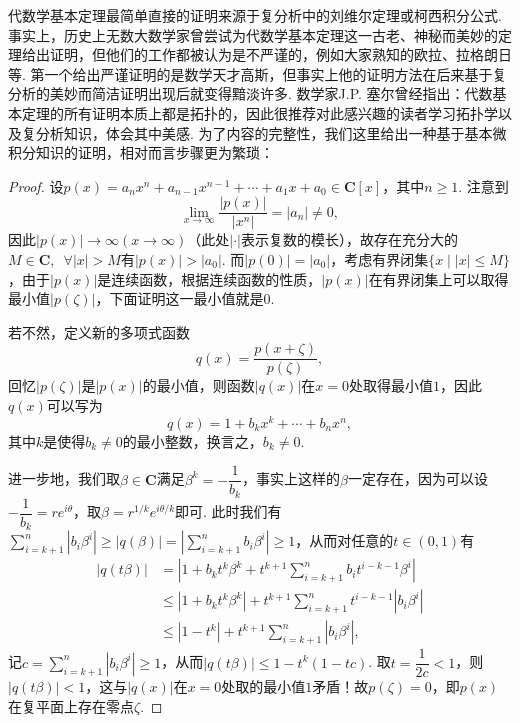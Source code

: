 代数学基本定理最简单直接的证明来源于复分析中的刘维尔定理或柯西积分公式. 事实上，历史上无数大数学家曾尝试为代数学基本定理这一古老、神秘而美妙的定理给出证明，但他们的工作都被认为是不严谨的，例如大家熟知的欧拉、拉格朗日等. 第一个给出严谨证明的是数学天才高斯，但事实上他的证明方法在后来基于复分析的美妙而简洁证明出现后就变得黯淡许多. 数学家J.P. 塞尔曾经指出：代数基本定理的所有证明本质上都是拓扑的，因此很推荐对此感兴趣的读者学习拓扑学以及复分析知识，体会其中美感. 为了内容的完整性，我们这里给出一种基于基本微积分知识的证明，相对而言步骤更为繁琐：
\begin{proof}
    设$p(x)=a_nx^n+a_{n-1}x^{n-1}+\cdots+a_1x+a_0\in\mathbf{C}[x]$，其中$n\geqslant 1$. 注意到
    \[\lim_{x\to\infty}\dfrac{|p(x)|}{|x^n|}=|a_n|\neq 0,\]
    因此$|p(x)|\to\infty(x\to\infty)$（此处$|\cdot|$表示复数的模长），故存在充分大的$M\in\mathbf{C},\enspace\forall |x|>M$有$|p(x)|>|a_0|$. 而$|p(0)|=|a_0|$，考虑有界闭集$\{x\mid |x|\leqslant M\}$，由于$|p(x)|$是连续函数，根据连续函数的性质，$|p(x)|$在有界闭集上可以取得最小值$|p(\zeta)|$，下面证明这一最小值就是$0$.

    若不然，定义新的多项式函数
    \[q(x)=\dfrac{p(x+\zeta)}{p(\zeta)},\]
    回忆$|p(\zeta)|$是$|p(x)|$的最小值，则函数$|q(x)|$在$x=0$处取得最小值$1$，因此$q(x)$可以写为
    \[q(x)=1+b_kx^k+\cdots+b_nx^n,\]
    其中$k$是使得$b_k\neq 0$的最小整数，换言之，$b_k\neq 0$.

    进一步地，我们取$\beta\in\mathbf{C}$满足$\beta^k=-\dfrac{1}{b_k}$，事实上这样的$\beta$一定存在，因为可以设$-\dfrac{1}{b_k}=re^{i\theta}$，取$\beta=r^{1/k}e^{i\theta/k}$即可. 此时我们有$\sum\limits_{i=k+1}^n |b_i\beta^i|\geqslant |q(\beta)|=\left|\sum\limits_{i=k+1}^n b_i\beta^i\right|\geqslant 1$，从而对任意的$t\in(0,1)$有
    \begin{align*}
        |q(t\beta)|
        &= \left|1+b_kt^k\beta^k+t^{k+1}\sum\limits_{i=k+1}^n b_i t^{i-k-1} \beta^i \right| \\
        &\leqslant |1+b_kt^k\beta^k|+t^{k+1}\sum\limits_{i=k+1}^n t^{i-k-1} |b_i\beta^i| \\
        &\leqslant |1- t^k|+t^{k+1}\sum\limits_{i=k+1}^n |b_i\beta^i|,
    \end{align*}
    记$c=\sum\limits_{i=k+1}^n |b_i\beta^i|\geqslant 1$，从而$|q(t\beta)|\leqslant 1-t^k(1-tc)$.
    取$t=\dfrac{1}{2c}<1$，则$|q(t\beta)|<1$，这与$|q(x)|$在$x=0$处取的最小值$1$矛盾！故$p(\zeta)=0$，即$p(x)$在复平面上存在零点$\zeta$.
\end{proof}

